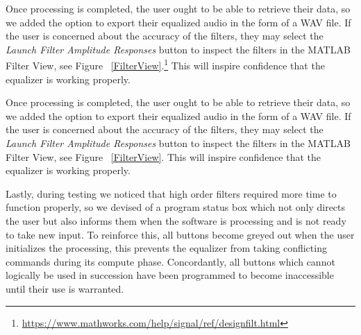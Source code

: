 Once processing is completed, the user ought to be able to retrieve their data, so we added the option to export their equalized audio in the form of a WAV file. If the user is concerned about the accuracy of the filters, they may select the \textit{Launch Filter Amplitude Responses} button to inspect the filters in the MATLAB Filter View, see Figure ~\ref{FilterView}.\footnote{\url{https://www.mathworks.com/help/signal/ref/designfilt.html}} This will inspire confidence that the equalizer is working properly.

Once processing is completed, the user ought to be able to retrieve their data, so we added the option to export their equalized audio in the form of a WAV file. If the user is concerned about the accuracy of the filters, they may select the \textit{Launch Filter Amplitude Responses} button to inspect the filters in the MATLAB Filter View, see Figure ~\ref{FilterView}. This will inspire confidence that the equalizer is working properly.

Lastly, during testing we noticed that high order filters required more time to function properly, so we devised of a program status box which not only directs the user but also informs them when the software is processing and is not ready to take new input. To reinforce this, all buttons become greyed out when the user initializes the processing, this prevents the equalizer from taking conflicting commands during its compute phase. Concordantly, all buttons which cannot logically be used in succession have been programmed to become inaccessible until their use is warranted.






